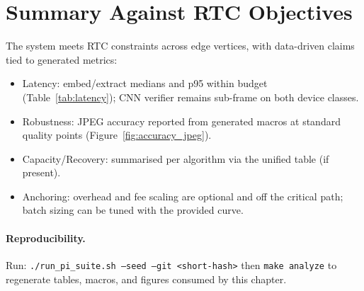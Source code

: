 \section{Summary Against RTC Objectives}
\label{sec:exp:summary}

The system meets RTC constraints across edge vertices, with data-driven claims tied to generated metrics:
\begin{itemize}
    \item Latency: embed/extract medians and p95 within budget (Table~\ref{tab:latency}); CNN verifier remains sub-frame on both device classes.
    \item Robustness: JPEG accuracy reported from generated macros at standard quality points (Figure~\ref{fig:accuracy_jpeg}).
    \item Capacity/Recovery: summarised per algorithm via the unified table (if present).
    \item Anchoring: overhead and fee scaling are optional and off the critical path; batch sizing can be tuned with the provided curve.
\end{itemize}

\paragraph{Reproducibility.} Run: \texttt{./run\_pi\_suite.sh --seed  --git <short-hash>} then \texttt{make analyze} to regenerate tables, macros, and figures consumed by this chapter.